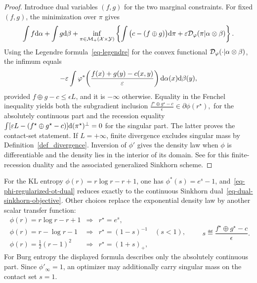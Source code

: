 \begin{proof}
Introduce dual variables $(f,g)$ for the two marginal constraints. For fixed $(f,g)$, the minimization over $\pi$ gives
\[
\int f\mathrm{d}\alpha+\int g\mathrm{d}\beta
+
\inf_{\pi\in\mathcal{M}_+(\mathcal{X}\times\mathcal{Y})}
\left\{
\int\big(c-(f\oplus g)\big)\mathrm{d}\pi
+
\varepsilon\mathcal{D}_\varphi(\pi|\alpha\otimes\beta)
\right\}.
\]
Using the Legendre formula~\eqref{eq-legendre} for the convex functional $\mathcal{D}_\varphi(\cdot|\alpha\otimes\beta)$, the infimum equals
\[
-\varepsilon
\int
\varphi^*\!\left(\frac{f(x)+g(y)-c(x,y)}{\varepsilon}\right)
\mathrm{d}\alpha(x)\mathrm{d}\beta(y),
\]
provided $f\oplus g-c\leq\epsilon L$, and it is $-\infty$ otherwise. Equality in the Fenchel inequality yields both the subgradient inclusion
\(\frac{f^\star\oplus g^\star-c}{\epsilon} \in \partial\phi(r^\star),\)
for the absolutely continuous part and the recession equality
$\int[\varepsilon L-(f^\star\oplus g^\star-c)]\mathrm{d}(\pi^\star)^\perp=0$ for the singular part. The latter proves the contact-set statement. If $L=+\infty$, finite divergence excludes singular mass by Definition~\ref{def_divergence}. Inversion of $\phi'$ gives the density law when $\phi$ is differentiable and the density lies in the interior of its domain. See for this finite-recession duality and the associated generalized Sinkhorn scheme.
\end{proof}
For the KL entropy $\phi(r)=r\log r-r+1$, one has $\phi^*(s)=e^s-1$, and~\eqref{eq-phi-regularized-ot-dual} reduces exactly to the continuous Sinkhorn dual~\eqref{eq-dual-sinkhorn-objective}. Other choices replace the exponential density law by another scalar transfer function:
\[
\begin{array}{lll}
\phi(r)=r\log r-r+1 &\Rightarrow& r^\star=e^s,\\[.25em]
\phi(r)=r-\log r-1 &\Rightarrow& r^\star=(1-s)^{-1}\quad (s<1),\\[.25em]
\phi(r)=\frac12(r-1)^2 &\Rightarrow& r^\star=(1+s)_+,
\end{array}
\qquad
s\eqdef\frac{f^\star\oplus g^\star-c}{\epsilon}.
\]
For Burg entropy the displayed formula describes only the absolutely continuous part. Since $\phi'_\infty=1$, an optimizer may additionally carry singular mass on the contact set $s=1$.

